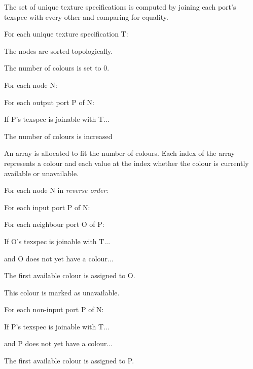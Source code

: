 \documentclass[format=sigconf]{acmart}
\begin{document}
\begin{step}
\item The set of unique texture specifications is computed by joining each port's texspec with every other and comparing for equality.
\item For each unique texture specification T:
  \begin{step}
  \item The nodes are sorted topologically.
  \item The number of colours is set to 0.
  \item For each node N:
    \begin{step}
    \item For each output port P of N:
      \begin{step}
      \item If P's texspec is joinable with T...
      \item The number of colours is increased
      \end{step}
    \end{step}
  \item An array is allocated to fit the number of colours. Each index of the array represents a colour and each value at the index whether the colour is currently available or unavailable.
  \item For each node N in \emph{reverse order}:
    \begin{step}
    \item For each input port P of N:
      \begin{step}
      \item For each neighbour port O of P:
        \begin{step}
        \item If O's texspec is joinable with T...
        \item and O does not yet have a colour...
        \item The first available colour is assigned to O.
        \item This colour is marked as unavailable.
        \end{step}
      \end{step}
    \item For each non-input port P of N:
      \begin{step}
      \item If P's texspec is joinable with T...
      \item and P does not yet have a colour...
      \item The first available colour is assigned to P.

\end{step}
\end{step}
\end{step}
\end{step}
\end{document}
